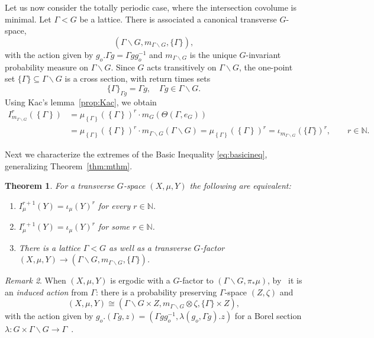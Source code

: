 \documentclass{amsart}
\numberwithin{equation}{subsection}
\newtheorem{thm}{Theorem}[section]
\theoremstyle{remark}
\newtheorem{rem}[thm]{Remark}
\begin{document}
Let us now consider the totally periodic case, where the intersection covolume is minimal. Let \(\Gamma<G\) be a lattice. There is associated a canonical transverse \(G\)-space,
\[\left(\Gamma\backslash G,m_{\Gamma\backslash G},\{\Gamma\}\right),\]
with the action given by \(g_{o}.\Gamma g=\Gamma gg_{o}^{-1}\) and \(m_{\Gamma\backslash G}\) is the unique \(G\)-invariant probability measure on \(\Gamma\backslash G\). Since \(G\) acts transitively on \(\Gamma\backslash G\), the one-point set \(\{\Gamma\}\subseteq \Gamma\backslash G\) is a cross section, with return times sets
\[\{\Gamma\}_{\Gamma g}=\Gamma g,\quad \Gamma g\in\Gamma\backslash G.\]
Using Kac's lemma~\ref{prop:Kac}, we obtain
\begin{align*}
I_{m_{\Gamma\backslash G}}^{r}\left(\left\{\Gamma\right\}\right)
&=\mu_{\left\{\Gamma\right\}}\left(\left\{\Gamma\right\} \right)^{r}\cdot m_{G}\left(\Theta\left(\Gamma,e_{G}\right)\right)\\
&=\mu_{\left\{\Gamma\right\}}\left(\left\{\Gamma\right\} \right)^{r}\cdot m_{\Gamma\backslash G}\left(\Gamma\backslash G\right)=\mu_{\left\{\Gamma\right\}}\left(\left\{\Gamma\right\} \right)^{r}=\iota_{m_{\Gamma\backslash G}}\left(\{\Gamma\}\right)^{r},\qquad r\in\mathbb{N}.
\end{align*}

Next we characterize the extremes of the Basic Inequality \eqref{eq:basicineq}, generalizing Theorem~\ref{thm:mthm}.

\begin{thm}\label{thm:mthm+}
For a transverse \(G\)-space \(\left(X,\mu,Y\right)\) the following are equivalent:
\begin{enumerate}
    \item \(I_{\mu}^{r+1}\left(Y\right)=\iota_{\mu}\left(Y\right)^{r}\) for every \(r\in\mathbb{N}\).
    \item \(I_{\mu}^{r+1}\left(Y\right)=\iota_{\mu}\left(Y\right)^{r}\) for some \(r\in\mathbb{N}\).
    \item There is a lattice \(\Gamma <G\) as well as a transverse \(G\)-factor \(\left(X,\mu,Y\right)\to\left(\Gamma\backslash G,m_{\Gamma\backslash G},\{\Gamma\}\right)\).
\end{enumerate}
\end{thm}

\begin{rem}
When \(\left(X,\mu,Y\right)\) is ergodic with a \(G\)-factor to \(\left(\Gamma\backslash G,\pi_{\ast}\mu\right)\), by~\cite[Theorem 2.5]{zimmer1978induced} it is an \emph{induced action} from \(\Gamma\): there is a probability preserving \(\Gamma\)-space \(\left(Z,\zeta\right)\) and
\[\left(X,\mu,Y\right)\cong\left(\Gamma\backslash G\times Z,m_{\Gamma\backslash G}\otimes\zeta,\{\Gamma\}\times Z\right),\]
with the action given by \(g_{o}.\left(\Gamma g,z\right)=\left(\Gamma gg_{o}^{-1},\lambda\left(g_{o},\Gamma g\right).z\right)\) for a Borel section \(\lambda:G\times\Gamma\backslash G\to\Gamma\)~\cite[II]{zimmer1978induced}.
\end{rem}
\end{document}
